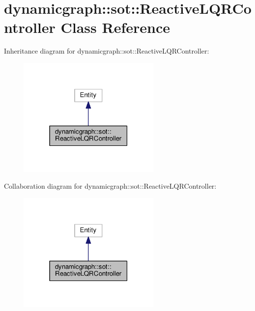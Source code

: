 \hypertarget{classdynamicgraph_1_1sot_1_1ReactiveLQRController}{}\section{dynamicgraph\+:\+:sot\+:\+:Reactive\+L\+Q\+R\+Controller Class Reference}
\label{classdynamicgraph_1_1sot_1_1ReactiveLQRController}


Inheritance diagram for dynamicgraph\+:\+:sot\+:\+:Reactive\+L\+Q\+R\+Controller\+:
\nopagebreak
\begin{figure}[H]
\begin{center}
\leavevmode
\includegraphics[width=198pt]{classdynamicgraph_1_1sot_1_1ReactiveLQRController__inherit__graph}
\end{center}
\end{figure}


Collaboration diagram for dynamicgraph\+:\+:sot\+:\+:Reactive\+L\+Q\+R\+Controller\+:
\nopagebreak
\begin{figure}[H]
\begin{center}
\leavevmode
\includegraphics[width=198pt]{classdynamicgraph_1_1sot_1_1ReactiveLQRController__coll__graph}
\end{center}
\end{figure}
